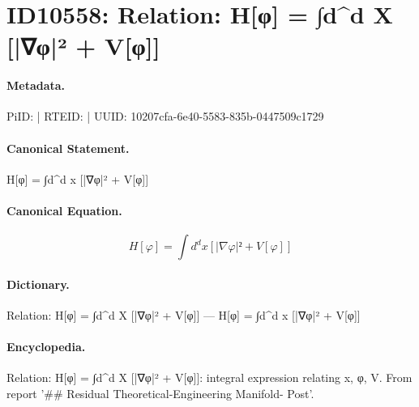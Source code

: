 \section*{ID10558: Relation: H[φ] = ∫d\textasciicircum{}d X [|∇φ|² + V[φ]]}
\paragraph{Metadata.}
PiID:  | RTEID:  | UUID: 10207cfa-6e40-5583-835b-0447509c1729

\paragraph{Canonical Statement.}
H[φ] = ∫d\textasciicircum{}d x [|∇φ|² + V[φ]]

\paragraph{Canonical Equation.}
\[
H[φ] = ∫d^d x [|∇φ|² + V[φ]]
\]

\paragraph{Dictionary.}
Relation: H[φ] = ∫d\textasciicircum{}d X [|∇φ|² + V[φ]] — H[φ] = ∫d\textasciicircum{}d x [|∇φ|² + V[φ]]

\paragraph{Encyclopedia.}
Relation: H[φ] = ∫d\textasciicircum{}d X [|∇φ|² + V[φ]]: integral expression relating x, φ, V. From report '\#\# Residual Theoretical-Engineering Manifold- Post'.
